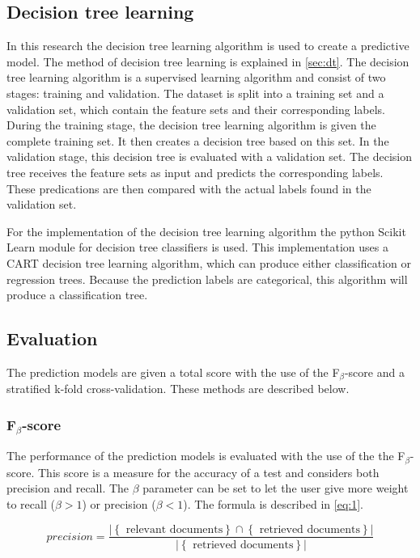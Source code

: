 \subsection{Decision tree learning}
In this research the decision tree learning algorithm is used to create a predictive model. The method of decision tree learning is explained in \autoref{sec:dt}. 
The decision tree learning algorithm is a supervised learning algorithm and consist of two stages: training and validation. The dataset is split into a training set and a validation set, which contain the feature sets and their corresponding labels. During the training stage, the decision tree learning algorithm is given the complete training set. It then creates a decision tree based on this set. In the validation stage, this decision tree is evaluated with a validation set. The decision tree receives the feature sets as input and predicts the corresponding labels. These predications are then compared with the actual labels found in the validation set. 

For the implementation of the decision tree learning algorithm the python Scikit Learn \cite{scikit-learn} module for decision tree classifiers is used. This implementation uses a CART\cite{breiman1983cart} decision tree learning algorithm, which can produce either classification or regression trees. Because the prediction labels are categorical, this algorithm will produce a classification tree.

\subsection{Evaluation}\label{sec:eval}
The prediction models are given a total score with the use of the F$_\beta$-score and a stratified k-fold cross-validation. These methods are described below.

\subsubsection{F$_\beta$-score}\label{sec:fbeta}
The performance of the prediction models is evaluated with the use of the the F$_\beta$-score. This score is a measure for the accuracy of a test and considers both precision and recall. The $\beta$ parameter can be set to let the user give more weight to recall ($\beta > 1 $) or precision ($\beta < 1 $). The formula is described in \autoref{eq:1}.

\begin{equation}\label{eq:1}
precision =  \frac{ \left\vert{\left\{ \text{ relevant documents} \right\} \cap \left\{ \text{ retrieved documents} \right\}}\right\vert }{ \left\vert{\left\{ \text{ retrieved documents} \right\}}\right\vert}
\end{equation}

